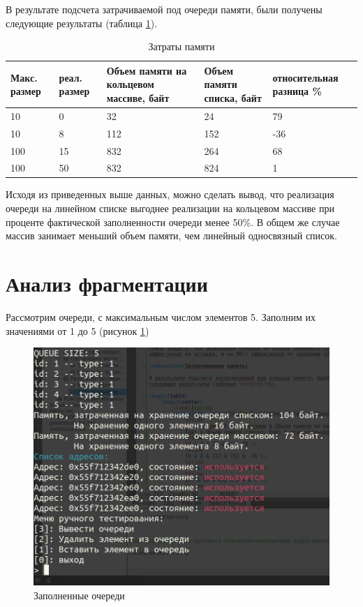В результате подсчета затрачиваемой под очереди памяти, были получены следующие результаты (таблица \ref{tab:m}).

\begin{table}
	\caption{Затраты памяти}
	\label{tab:m}
	\begin{center}
		\begin{tabular}{|m{7em}|m{5em}|m{7em}|m{7em}|m{10em}|}
			\hline
			Макс. размер & реал. размер & Объем памяти на кольцевом массиве, байт & Объем памяти списка, байт & относительная разница \% \\
			\hline
			10 & 0 & 32 & 24 & 79 \\
			\hline
			10 & 8 & 112 & 152 & -36 \\
			\hline
			100 & 15 & 832 & 264 & 68 \\
			\hline
			100 & 50 & 832 & 824 & 1 \\
			\hline
		\end{tabular}
	\end{center}
\end{table}

Исходя из приведенных выше данных, можно сделать вывод, что реализация очереди на линейном списке выгоднее реализации на кольцевом массиве при проценте фактической заполненности очереди менее 50\%. В общем же случае массив занимает меньший объем памяти, чем линейный односвязный список.

\section{Анализ фрагментации}

Рассмотрим очереди, с максимальным числом элементов 5. Заполним их значениями от 1 до 5 (рисунок \ref{fig:frag1})

\clearpage

\begin{figure}
	\centering
	\includegraphics[width=0.6\linewidth]{img/frag1}
	\caption{Заполненные очереди}
	\label{fig:frag1}
\end{figure}

